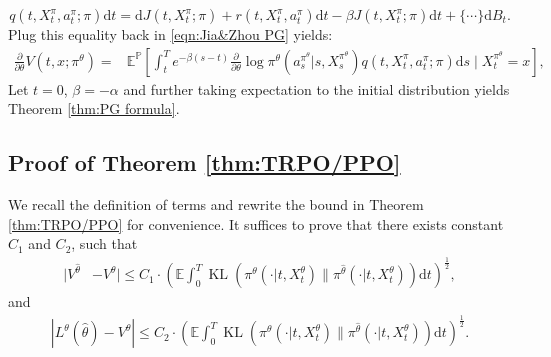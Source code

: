 \documentclass{article}
\theoremstyle{plain}
\theoremstyle{definition}
\theoremstyle{remark}
\begin{document}
\begin{equation}
q\left(t, X_t^{\pi}, a_t^{\pi} ; \pi\right) \mathrm{d} t=\mathrm{d} J\left(t, X_t^{\pi} ; \pi\right)+r\left(t, X_t^{\pi}, a_t^{\pi}\right) \mathrm{d} t-\beta J\left(t, X_t^{\pi} ; \pi\right) \mathrm{d} t+\{\cdots\} \mathrm{d} B_t.
\end{equation}
Plug this equality back in \eqref{eqn:Jia&Zhou PG} yields:
\begin{equation}
\begin{aligned}
\frac{\partial}{\partial \theta} V(t, x ; \pi^\theta)= & \mathbb{E}^{\mathbb{P}}\left[\int _ { t } ^ { T } e ^ { - \beta ( s - t ) } \frac { \partial } { \partial \theta} \log \pi^ { \theta} ( a _ { s } ^ { \pi ^ {\theta} } | s , X _ { s } ^ {\pi^ {\theta} } ) q\left(t, X_t^{\pi}, a_t^{\pi} ; \pi\right)\mathrm{d} s \mid X_t^{\pi^\theta}=x\right],
\end{aligned}
\end{equation}
Let $t=0$, $\beta = -\alpha$ and further taking expectation to the initial distribution yields Theorem \ref{thm:PG formula}.


\subsection{Proof of Theorem \ref{thm:TRPO/PPO}}
\label{Proof of TRPO/PPO}
We recall the definition of terms and rewrite the bound in Theorem \ref{thm:TRPO/PPO} for convenience. It suffices to prove that there exists constant $C_1$ and $C_2$, such that
\begin{align}
\label{Direct Performance Difference}
|V^{\hat{\theta}} & - V^{\theta}|\leq C_1 \cdot \left(\mathbb{E}\int_{0}^{T} \operatorname{KL}(\pi^{\theta}(\cdot | t , X _ { t } ^ {\theta} )\|\pi^{\hat{\theta}}( \cdot | t , X _ { t } ^ {\theta} ))\mathrm{d}t\right)^{\frac{1}{2}},
\end{align}
and 
\begin{align}
\label{Local Approximation Difference}
|L^{\theta}(\hat{\theta}) - V^{\theta}|\leq C_2 \cdot \left(\mathbb{E}\int_{0}^{T} \operatorname{KL}(\pi^{\theta}(\cdot | t , X _ { t } ^ {\theta} )\|\pi^{\hat{\theta}}( \cdot | t , X _ { t } ^ {\theta} ))\mathrm{d}t\right)^{\frac{1}{2}}.
\end{align}
\end{document}

